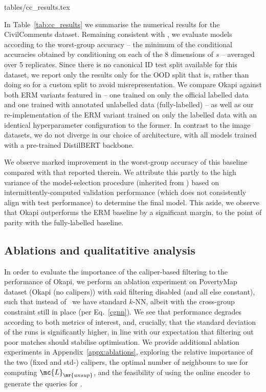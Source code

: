 {tables/cc_results.tex}

In Table~\ref{tab:cc_results} we summarise the numerical results for the CivilComments dataset.
Remaining consistent with \cite{SagWeiLeeGaoetal22}, we evaluate models according to the
worst-group accuracy -- the minimum of the conditional accuracies obtained by conditioning on each
of the 8 dimensions of $s$ -- averaged over 5 replicates. Since there is no canonical ID test split
available for this dataset, we report only the results only for the OOD split that is, rather than
doing so for a custom split to avoid misrepresentation. We compare Okapi against both ERM variants
featured in \cite{SagWeiLeeGaoetal22} -- one trained on only the official labelled data and one
trained with annotated unlabelled data (fully-labelled) -- as well as our re-implementation of the
ERM variant trained on only the labelled data with an identical hyperparameter configuration to the
former. In contrast to the image datasets, we do not diverge in our choice of architecture, with
all models trained with a pre-trained DistilBERT \citep{sanh2019distilbert} backbone.

We observe marked improvement in the worst-group accuracy of this baseline compared with that
reported therein. We attribute this partly to the high variance of the model-selection procedure
(inherited from \cite{SagWeiLeeGaoetal22}) based on intermittently-computed validation performance
(which does not consistently align with test performance) to determine the final model. This aside,
we observe that Okapi outperforms the ERM baseline by a significant margin, to the point of parity
with the fully-labelled baseline.

\subsection{Ablations and qualitatitive analysis}


In order to evaluate the importance of the caliper-based filtering to the performance of Okapi, we
perform an ablation experiment on PovertyMap dataset (Okapi (no calipers)) with said filtering
disabled (and all else constant), such that instead of \CNN\ we have standard $k$-NN, albeit with
the cross-group constraint still in place (per Eq.~\ref{cgnn}).
%
We see that performance degrades according to both metrics of interest, and, crucially, that the
standard deviation of the runs is significantly higher, in line with our expectation that filtering
out poor matches should stabilise optimisation.
%
We provide additional ablation experiments in Appendix~\ref{appx:ablations}, exploring the relative
importance of the two (fixed and std-) calipers, the optimal number of neighbours to use for
computing $\mc{L}_\mr{unsup}$, and the feasibility of using the online encoder to generate the
queries for \CNN.

